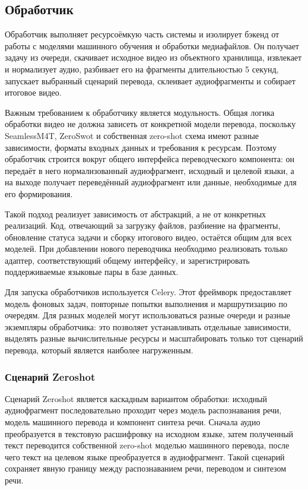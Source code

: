 \documentclass[a4paper,article,14pt]{extarticle}
\begin{document}
\subsection{Обработчик}

Обработчик выполняет ресурсоёмкую часть системы и изолирует бэкенд от работы с моделями машинного обучения и обработки медиафайлов. Он получает задачу из очереди, скачивает исходное видео из объектного хранилища, извлекает и нормализует аудио, разбивает его на фрагменты длительностью 5 секунд, запускает выбранный сценарий перевода, склеивает аудиофрагменты и собирает итоговое видео.

Важным требованием к обработчику является модульность. Общая логика обработки видео не должна зависеть от конкретной модели перевода, поскольку SeamlessM4T, ZeroSwot и собственная zero-shot схема имеют разные зависимости, форматы входных данных и требования к ресурсам. Поэтому обработчик строится вокруг общего интерфейса переводческого компонента: он передаёт в него нормализованный аудиофрагмент, исходный и целевой языки, а на выходе получает переведённый аудиофрагмент или данные, необходимые для его формирования.

Такой подход реализует зависимость от абстракций, а не от конкретных реализаций. Код, отвечающий за загрузку файлов, разбиение на фрагменты, обновление статуса задачи и сборку итогового видео, остаётся общим для всех моделей. При добавлении нового переводчика необходимо реализовать только адаптер, соответствующий общему интерфейсу, и зарегистрировать поддерживаемые языковые пары в базе данных.

Для запуска обработчиков используется Celery. Этот фреймворк предоставляет модель фоновых задач, повторные попытки выполнения и маршрутизацию по очередям. Для разных моделей могут использоваться разные очереди и разные экземпляры обработчика: это позволяет устанавливать отдельные зависимости, выделять разные вычислительные ресурсы и масштабировать только тот сценарий перевода, который является наиболее нагруженным.

\subsubsection{Сценарий Zeroshot}

Сценарий Zeroshot является каскадным вариантом обработки: исходный аудиофрагмент последовательно проходит через модель распознавания речи, модель машинного перевода и компонент синтеза речи. Сначала аудио преобразуется в текстовую расшифровку на исходном языке, затем полученный текст переводится собственной zero-shot моделью машинного перевода, после чего текст на целевом языке преобразуется в аудиофрагмент. Такой сценарий сохраняет явную границу между распознаванием речи, переводом и синтезом речи.
\end{document}
